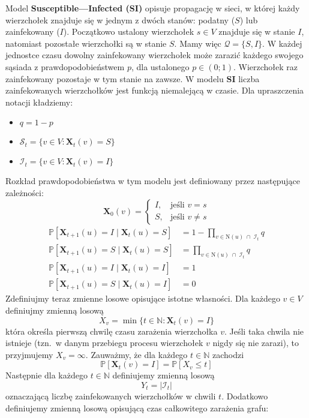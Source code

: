Model \textbf{Susceptible—Infected (SI)} opisuje propagację w sieci, w której każdy wierzchołek znajduje się w jednym z dwóch stanów: podatny ($S$) lub zainfekowany ($I$).  
Początkowo ustalony wierzchołek $s \in V$ znajduje się w stanie $I$, natomiast pozostałe wierzchołki są w stanie $S$. Mamy więc $\mathcal{Q} = \{S, I\}$.
W każdej jednostce czasu dowolny zainfekowany wierzchołek może zarazić każdego swojego sąsiada z prawdopodobieństwem $p$, dla ustalonego $p \in (0;1)$.  
Wierzchołek raz zainfekowany pozostaje w tym stanie na zawsze.  
W modelu \textbf{SI} liczba zainfekowanych wierzchołków jest funkcją niemalejącą w czasie.
Dla upraszczenia notacji kładziemy: 
\begin{itemize}
    \item $q=1-p$
    \item $\mathcal{S}_t=\{v\in V: \mathbf{X}_t(v) = S\}$
    \item $\mathcal{I}_t=\{v\in V: \mathbf{X}_t(v) = I\}$
\end{itemize}
Rozkład prawdopodobieństwa w tym modelu jest definiowany przez następujące zależności:
\[
\mathbf{X}_0(v) =
\begin{cases}
I, & \text{jeśli } v = s \\[4pt]
S, & \text{jeśli } v \neq s
\end{cases}
\]
\[
\begin{aligned}
\mathbb{P}[\mathbf{X}_{t+1}(u) = I \mid \mathbf{X}_t(u) = S]
 &= 1 - \prod_{v \in \mathrm{N}(u) \;\cap\; \mathcal{I}_t} q \\[6pt]
\mathbb{P}[\mathbf{X}_{t+1}(u) = S \mid \mathbf{X}_t(u) = S]
 &= \prod_{v \in \mathrm{N}(u) \;\cap\; \mathcal{I}_t} q \\[6pt]
\mathbb{P}[\mathbf{X}_{t+1}(u) = I \mid \mathbf{X}_t(u) = I]
 &= 1 \\[6pt]
\mathbb{P}[\mathbf{X}_{t+1}(u) = S \mid \mathbf{X}_t(u) = I]
 &= 0
\end{aligned}
\]
Zdefiniujmy teraz zmienne losowe opisujące istotne własności.
Dla każdego $v \in V$ definiujmy zmienną losową
\[
X_v = \min \{ t \in \mathbb{N} : \mathbf{X}_t(v) = I \}
\]
która określa pierwszą chwilę czasu zarażenia wierzchołka $v$.
Jeśli taka chwila nie istnieje (tzn.\ w danym przebiegu procesu wierzchołek $v$ nigdy się nie zarazi), to przyjmujemy $X_v = \infty$.
Zauważmy, że dla każdego $t \in \mathbb{N}$ zachodzi 
\[
    \mathbb{P}[\mathbf{X}_t(v) = I] = \mathbb{P}[X_v \le t]
\]
Następnie dla każdego $t\in\mathbb{N}$ definiujemy zmienną losową 
\[
    Y_t = |\mathcal{I}_t|
\]
oznaczającą liczbę zainfekowanych wierzchołków w chwili $t$. Dodatkowo definiujemy zmienną losową opisującą czas całkowitego zarażenia grafu:
